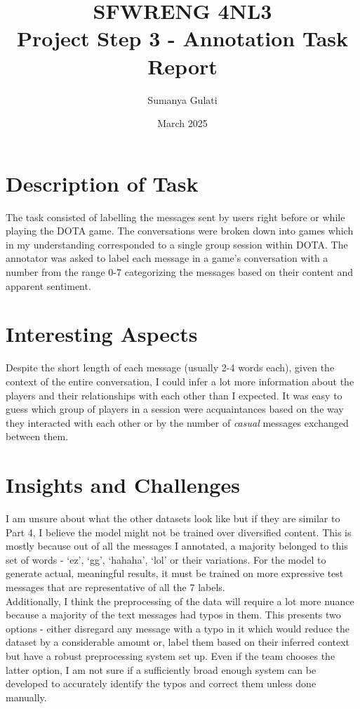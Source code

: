 \documentclass[titlepage]{article}
\title{SFWRENG 4NL3\\ Project Step 3 - Annotation Task Report}
\author{Sumanya Gulati}
\date{March 2025}
\begin{document}
\begin{titlepage}
    \maketitle
\end{titlepage}

\newpage

\section{Description of Task}
The task consisted of labelling the  messages sent by users right before or while playing
the DOTA game. The conversations were broken down into games which in my understanding 
corresponded to a single group session within DOTA. The annotator was asked to label each message 
in a game's conversation with a number from the range 0-7 categorizing the messages based on 
their content and apparent sentiment.

\section{Interesting Aspects}
Despite the short length of each message (usually 2-4 words each), given the context of the entire
conversation, I could infer a lot more information about the players and their relationships with 
each other than I expected. It was easy to guess which group of players in a session were acquaintances
based on the way they interacted with each other or by the number of \emph{casual} messages exchanged 
between them. 

\section{Insights and Challenges}
I am unsure about what the other datasets look like but if they are similar to Part 4, I believe the model 
might not be trained over diversified content. This is mostly because out of all the messages I annotated, a 
majority belonged to this set of words - `ez', `gg', `hahaha', `lol' or their variations. For the model to 
generate actual, meaningful results, it must be trained on more expressive test messages that are representative 
of all the 7 labels.\\
\newline
Additionally, I think the preprocessing of the data will require a lot more nuance because a majority of the 
text messages had typos in them. This presents two options - either disregard any message with a typo in it which 
would reduce the dataset by a considerable amount or, label them based on their inferred context but have a 
robust preprocessing system set up. Even if the team chooses the latter option, I am not sure if a sufficiently 
broad enough system can be developed to accurately identify the typos and correct them unless done manually.
\end{document}
